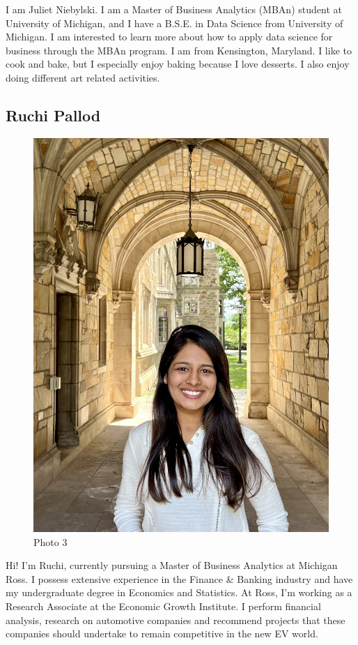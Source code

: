 \documentclass[
]{article}
\begin{document}
I am Juliet Niebylski. I am a Master of Business Analytics (MBAn) student at University of Michigan, and I have a B.S.E. in Data Science from University of Michigan. I am interested to learn more about how to apply data science for business through the MBAn program. I am from Kensington, Maryland. I like to cook and bake, but I especially enjoy baking because I love desserts. I also enjoy doing different art related activities.

\hypertarget{ruchi-pallod}{%
\subsection{Ruchi Pallod}\label{ruchi-pallod}}

\begin{figure}
\centering
\includegraphics{Ruchi Profile.jpg}
\caption{Photo 3}
\end{figure}

Hi! I'm Ruchi, currently pursuing a Master of Business Analytics at Michigan Ross. I possess extensive experience in the Finance \& Banking industry and have my undergraduate degree in Economics and Statistics.
At Ross, I'm working as a Research Associate at the Economic Growth Institute. I perform financial analysis, research on automotive companies and recommend projects that these companies should undertake to remain competitive in the new EV world.
\end{document}
